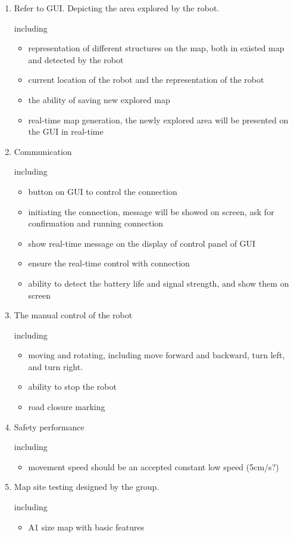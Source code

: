 \documentclass[11pt, a4paper]{article}
\begin{document}
\begin{enumerate}
\item Refer to GUI. Depicting the area explored by the robot.

including 
\begin {itemize} 
\item representation of different structures on the map, both in existed map and detected by the robot
\item current location of the robot and the representation of the robot
\item the ability of saving new explored map
\item real-time map generation, the newly explored area will be presented on the GUI in real-time
\end {itemize}
\item Communication

including
\begin {itemize}
\item button on GUI to control the connection
\item initiating the connection, message will be showed on screen, ask for confirmation and running connection
\item show real-time message on the display of control panel of GUI
\item ensure the real-time control with connection
\item ability to detect the battery life and signal strength, and show them on screen
\end {itemize}
\item The manual control of the robot

including
\begin {itemize}
\item moving and rotating, including move forward and backward, turn left, and turn right.
\item ability to stop the robot
\item road closure marking
\end {itemize}
\item Safety performance

including
\begin {itemize}
\item movement speed should be an accepted constant low speed (5cm/s?)
\end {itemize}
\item Map site testing designed by the group.

including
\begin {itemize}
\item A1 size map with basic features
\end {itemize}

\end{enumerate}
\end{document}
